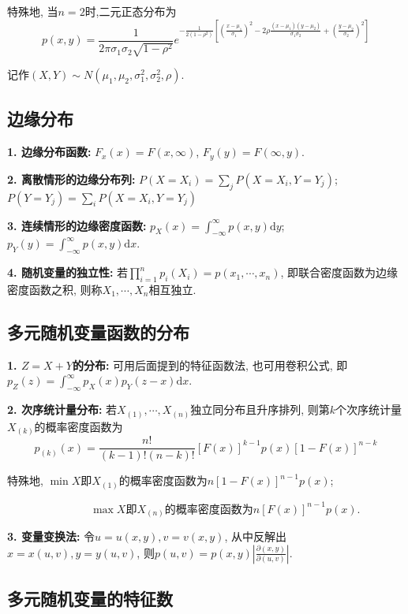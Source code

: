特殊地, 当$n=2$时,二元正态分布为
\begin{equation*}
    p(x,y)=\frac{1}{2\pi \sigma_1\sigma_2\sqrt{1-\rho^2}}e^{-\frac{1}{2(1-\rho^2)}[(\frac{x-\mu_1}{\sigma_1})^2-2\rho\frac{(x-\mu_1)(y-\mu_2)}{\sigma_1\sigma_2}+(\frac{y-\mu_2}{\sigma_2})^2]}
\end{equation*}

记作$(X,Y)\sim N(\mu_1,\mu_2,\sigma_1^2,\sigma_2^2,\rho)$.

\subsection{边缘分布}

\textbf{1. 边缘分布函数: }$F_x(x)=F(x,\infty)$, $F_y(y)=F(\infty,y)$.

\textbf{2. 离散情形的边缘分布列: }$P(X=X_i)=\sum\limits_j P(X=X_i,Y=Y_j)$; $P(Y=Y_j)=\sum\limits_i P(X=X_i,Y=Y_j)$

\textbf{3. 连续情形的边缘密度函数: }$p_X(x)=\int_{-\infty}^\infty p(x,y) \mathrm{d}y$; $p_Y(y)=\int_{-\infty}^\infty p(x,y) \mathrm{d}x$.

\textbf{4. 随机变量的独立性: }若$\prod\limits_{i=1}^n p_i(X_i)=p(x_1,\cdots,x_n)$, 即联合密度函数为边缘密度函数之积, 则称$X_1,\cdots, X_n$相互独立.

\subsection{多元随机变量函数的分布}

\textbf{1. $Z=X+Y$的分布: }可用后面提到的特征函数法, 也可用卷积公式, 即$p_Z(z)=\int_{-\infty}^\infty p_X(x)p_Y(z-x)\mathrm{d}x$.

\textbf{2. 次序统计量分布: }若$X_{(1)},\cdots,X_{(n)}$独立同分布且升序排列, 则第$k$个次序统计量$X_{(k)}$的概率密度函数为
\begin{equation*}
    p_{(k)}(x)=\frac{n!}{(k-1)!(n-k)!}[F(x)]^{k-1}p(x)[1-F(x)]^{n-k}
\end{equation*}

特殊地, $\min X$即$X_{(1)}$的概率密度函数为$n[1-F(x)]^{n-1}p(x)$; 
    
~~~~~~~~~~~~~~~$\max X$即$X_{(n)}$的概率密度函数为$n[F(x)]^{n-1}p(x)$. 

\textbf{3. 变量变换法: }令$u=u(x,y), v=v(x,y)$, 从中反解出$x=x(u,v), y=y(u,v)$, 则$p(u,v)=p(x,y)\left|\frac{\partial (x,y)}{\partial(u,v)}\right|$.

\subsection{多元随机变量的特征数}


